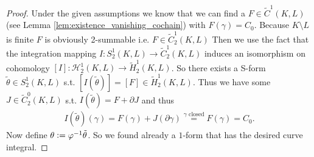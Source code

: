 \documentclass[12pt,a4paper]{article}
\numberwithin{equation}{subsection}
\numberwithin{lemma}{subsection}
\theoremstyle{definition}
\begin{document}
\begin{proof}
    Under the given assumptions we know that we can find a 
    $F \in \tilde{C}^1(K,L)$ (see Lemma \ref{lem:existence_vanishing_cochain})
    with $F(\gamma) = C_0$. 
    Because $K \setminus L$ is finite $F$ is obviously 2-summable 
    i.e. $F \in  \tilde{C}_2^1(K,L)$
    Then we use the fact that the integration mapping 
    $I: S^1_2(K,L) \rightarrow \tilde{C}^1_2(K,L)$ induces an isomorphism 
    on cohomology
    $[I]: \mathscr{H}^1_2(K,L) \rightarrow \tilde{H}^1_2(K,L)$.
    So there exists a 
    S-form $\tilde{\theta} \in S^1_2(K,L)$
    s.t. $[I(\tilde{\theta})] = [F] \in \tilde{H}_2^1(K,L)$. Thus 
    we have some $J \in \tilde{C}^0_2(K,L)$ s.t. 
    $I(\tilde{\theta}) = F + \partial J$ and thus 
    \begin{align*}
        I(\tilde{\theta})(\gamma) = F(\gamma) + J(\partial \gamma)
        \stackrel{\gamma \text{ closed}}{=} F(\gamma) = C_0.      
    \end{align*}
    Now define $\theta \vcentcolon= \varphi^{-1} \tilde{\theta}$.
    So we found already a $1$-form that has the desired curve integral.


\end{proof}
\end{document}
